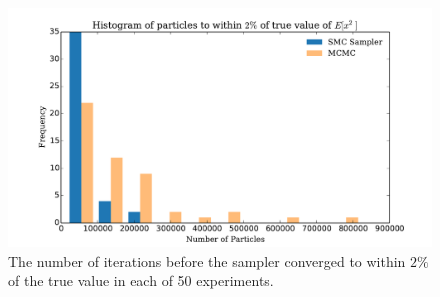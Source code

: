 \documentclass[12pt]{elsarticle}
\begin{document}
\begin{figure}[htbp]
\begin{center}
\includegraphics[width = \textwidth]{plots/iterationsEx2.pdf}
\caption{The number of iterations before the sampler converged to within $2\%$ of the true value in each of 50 experiments.}
\label{ig:itersEX2}
\end{center}
\end{figure}





\end{document}
